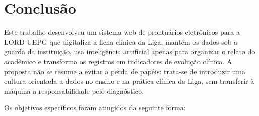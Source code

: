 \chapter{Conclusão}
\label{cap:conclusao}

Este trabalho desenvolveu um sistema web de prontuários eletrônicos para a LORD-UEPG que digitaliza a ficha clínica da Liga, mantém os dados sob a guarda da instituição, usa inteligência artificial apenas para organizar o relato do acadêmico e transforma os registros em indicadores de evolução clínica. A proposta não se resume a evitar a perda de papéis: trata-se de introduzir uma cultura orientada a dados no ensino e na prática clínica da Liga, sem transferir à máquina a responsabilidade pelo diagnóstico.

Os objetivos específicos foram atingidos da seguinte forma:

